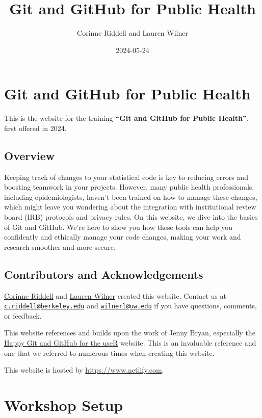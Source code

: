 \documentclass[
]{book}
\title{Git and GitHub for Public Health}
\author{Corinne Riddell and Lauren Wilner}
\date{2024-05-24}
\begin{document}
\maketitle

{
\setcounter{tocdepth}{1}
\tableofcontents
}
\chapter{Git and GitHub for Public Health}\label{git-and-github-for-public-health}

This is the website for the training \textbf{``Git and GitHub for Public Health''},
first offered in 2024.

\section{Overview}\label{overview}

Keeping track of changes to your statistical code is key to reducing errors and boosting teamwork in your projects. However, many public health professionals, including epidemiologists, haven't been trained on how to manage these changes, which might leave you wondering about the integration with institutional review board (IRB) protocols and privacy rules. On this website, we dive into the basics of Git and GitHub. We're here to show you how these tools can help you confidently and ethically manage your code changes, making your work and research smoother and more secure.

\section{Contributors and Acknowledgements}\label{contributors-and-acknowledgements}

\href{https://corinne-riddell.github.io/}{Corinne Riddell} and \href{laurenwilner.github.io}{Lauren Wilner}
created this website. Contact us at \href{mailto:c.riddell@berkeley.edu}{\nolinkurl{c.riddell@berkeley.edu}} and \href{mailto:wilnerl@uw.edu}{\nolinkurl{wilnerl@uw.edu}} if
you have questions, comments, or feedback.

This website references and builds upon the work of Jenny Bryan, especially the
\href{https://happygitwithr.com/}{Happy Git and GitHub for the useR} website. This is
an invaluable reference and one that we referred to numerous times when creating
this website.

This website is hosted by \url{https://www.netlify.com}.

\chapter{Workshop Setup}\label{workshop-setup}
\end{document}
